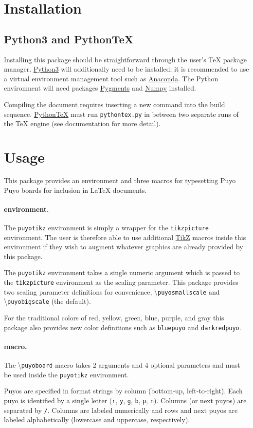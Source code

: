 \documentclass{article}
\newcommand{\latex}{\LaTeX\xspace}
\newcommand{\tex}{\TeX\xspace}
\newcommand{\link}[2]{\href{#1}{\color{darkbluepuyo}#2}}
\newcommand{\code}[1]{{\small\texttt{#1}}}
\newcommand{\cmd}[1]{{\small\textbackslash\texttt{#1}}}
\newcommand{\codepar}[2]{\paragraph{\color{darkgreenpuyo}\code{#1} #2.}\mbox{}\par}
\newcommand{\python}{\link{https://www.python.org/download/releases/3.0/}{Python3}\xspace}
\newcommand{\anaconda}{\link{https://www.anaconda.com/products/individual}{Anaconda}\xspace}
\newcommand{\pypygments}{\link{https://pygments.org/}{Pygments}\xspace}
\newcommand{\pynumpy}{\link{https://numpy.org/}{Numpy}\xspace}
\newcommand{\pythontex}{\link{https://ctan.org/pkg/pythontex?lang=en}{Python\tex}\xspace}
\newcommand{\tikzpgf}{\link{https://ctan.org/pkg/pgf?lang=en}{TikZ}\xspace}
\begin{document}
\section{Installation}
\subsection{Python3 and PythonTeX}
Installing this package should be straightforward through the user's \tex package manager. \python will additionally need to be installed; it is recommended to use a virtual environment management tool such as \anaconda. The Python environment will need packages \pypygments and \pynumpy installed.\par
Compiling the document requires inserting a new command into the build sequence. \pythontex must run \code{pythontex.py} in between two separate runs of the \tex engine (see documentation for more detail).

\section{Usage}
This package provides an environment and three macros for typesetting Puyo Puyo boards for inclusion in \latex documents.

\codepar{puyotikz}{environment}
The \code{puyotikz} environment is simply a wrapper for the \code{tikzpicture} environment. The user is therefore able to use additional \tikzpgf macros inside this environment if they wish to augment whatever graphics are already provided by this package.\par
The \code{puyotikz} environment takes a single numeric argument which is passed to the \code{tikzpicture} environment as the scaling parameter. This package provides two scaling parameter definitions for convenience, \cmd{puyosmallscale} and \cmd{puyobigscale} (the default).

\begin{puyolisting}
	\begin{puyotikz}[\puyosmallscale]
	\end{puyotikz}
\end{puyolisting}

For the traditional colors of red, yellow, green, blue, purple, and gray this package also provides new color definitions such as \code{bluepuyo} and \code{darkredpuyo}.

\pagebreak
\codepar{puyoboard}{macro}
The \cmd{puyoboard} macro takes 2 arguments and 4 optional parameters and must be used inside the \code{puyotikz} environment.\par
Puyos are specified in format strings by column (bottom-up, left-to-right). Each puyo is identified by a single letter (\code{r}, \code{y}, \code{g}, \code{b}, \code{p}, \code{n}). Columns (or next puyos) are separated by \code{/}. Columns are labeled numerically and rows and next puyos are labeled alphabetically (lowercase and uppercase, respectively).
\end{document}
